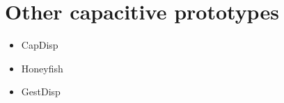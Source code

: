 \section{Other capacitive prototypes}
\begin{itemize}
\item CapDisp
\item Honeyfish
\item GestDisp
\end{itemize}